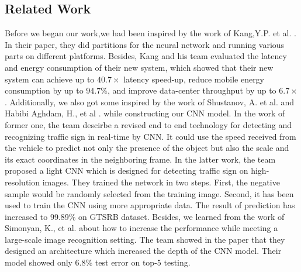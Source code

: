 \documentclass[conference]{IEEEtran}
\begin{document}
\subsection{Related Work}

Before we began our work,we had been inspired by the work of Kang,Y.P. et al. \cite{b1}. In their paper, they did partitions for the neural network and running various parts on different platforms. Besides, Kang and his team evaluated the latency and energy consumption of their new system, which showed that their new system can achieve up to $40.7 \times$ latency speed-up, reduce mobile energy consumption by up to $94.7 \%$, and improve data-center throughput by up to $6.7 \times$. Additionally, we also got some inspired by the work of Shustanov, A. et al. \cite{b2} and Habibi Aghdam, H., et al \cite{b3}. while constructing our CNN model. In the work of former one, the team descirbe a revised end to end technology for detecting and recognizing traffic sign in real-time by CNN. It could use the speed received from the vehicle to predict not only the presence of the object but also the scale and its exact coordinates in the neighboring frame. In the latter work, the team proposed a light CNN which is designed for detecting traffic sign on high-resolution images. They trained the network in two steps. First, the negative sample would be randomly selected from the training image. Second, it has been used to train the CNN using more appropriate data. The result of prediction has increased to 99.89\% on GTSRB dataset. Besides, we learned from the work of Simonyan, K., et al. \cite{b4} about how to increase the performance while meeting a large-scale image recognition setting. The team showed in the paper that they designed an architecture which increased the depth of the CNN model. Their model showed only 6.8\% test error on top-5 testing.   
\end{document}
